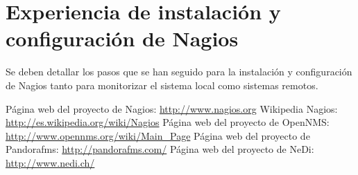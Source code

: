 \documentclass[11pt,a4paper]{article}
\begin{document}
\section{Experiencia de instalación y configuración de  Nagios}

Se deben detallar los pasos que se han seguido para la instalación y configuración de Nagios
tanto para monitorizar el sistema local como sistemas remotos.

\begin{thebibliography}{1}

 Página web del proyecto de Nagios: \url{http://www.nagios.org}
 Wikipedia Nagios: \url{http://es.wikipedia.org/wiki/Nagios}
 Página web del proyecto de OpenNMS: \url{http://www.opennms.org/wiki/Main_Page}
 Página web del proyecto de Pandorafms: \url{http://pandorafms.com/}
 Página web del proyecto de NeDi: \url{http://www.nedi.ch/}

\end{thebibliography}
\end{document}
